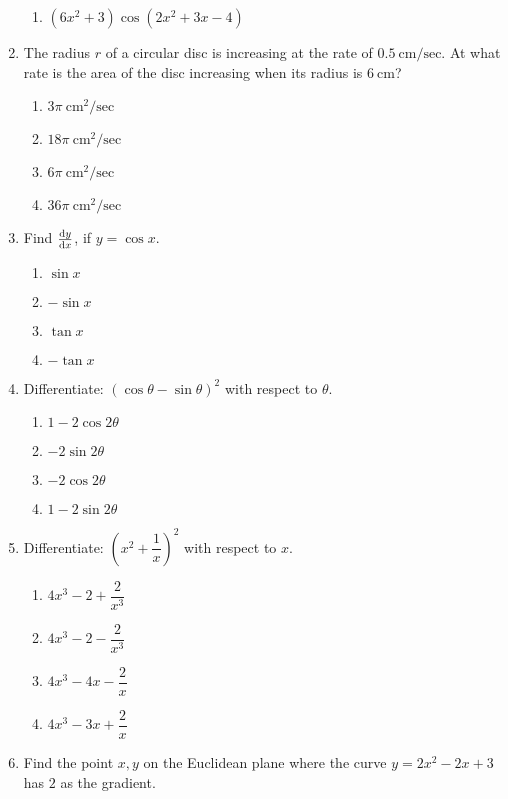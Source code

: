 \begin{multicols}{2}
\begin{enumerate}[label={\arabic*.}]
\begin{enumerate}[label={\Alph*.}]
		\item \((6{x}^{2} + 3) \cos(2{x}^{2}+3x-4)\)
	\end{enumerate}
\item The radius \(r\) of a circular disc is increasing at the rate of \(0.5\ \text{cm/sec}\). At what rate is the area of the disc increasing when its radius is \(6\ \text{cm}\)?
	\begin{enumerate}[label={\Alph*.}]
		\item \(3\pi\ \text{cm}^2/\text{sec}\)
		\item \(18\pi\ \text{cm}^2/\text{sec}\)
		\item \(6\pi\ \text{cm}^2/\text{sec}\)
		\item \(36\pi\ \text{cm}^2/\text{sec}\)
	\end{enumerate}
\item Find \(\dv{y}{x}\), if \(y = \cos x\).
	\begin{enumerate}[label={\Alph*.}]
		\item  \(\sin x\)
		\item  \(-\sin x\)
		\item  \(\tan x\)
		\item  \(-\tan x\)
	\end{enumerate}
\item Differentiate: \((\cos \theta - \sin \theta)^2\) with respect to \(\theta\).
	\begin{enumerate}[label={\Alph*.}]
		\item  \(1-2\cos 2\theta\)
		\item  \(-2\sin 2\theta\)
		\item  \(-2\cos 2\theta\)
		\item  \(1-2\sin 2\theta\)
	\end{enumerate}
\item Differentiate: \(\left({x}^{2} + \dfrac{1}{x}\right)^2\) with respect to \(x\).
	\begin{enumerate}[label={\Alph*.}]
		\item \(4{x}^{3} - 2 + \dfrac{2}{{x}^{3}}\)
		\item \(4{x}^{3} - 2 - \dfrac{2}{{x}^{3}}\)
		\item \(4{x}^{3} - 4x - \dfrac{2}{x}\)
		\item \(4{x}^{3} - 3x + \dfrac{2}{x}\)
	\end{enumerate}
\item Find the point \(x,y\) on the Euclidean plane where the curve \(y = 2x^{2} - 2x +3\) has \(2\) as the gradient.
\begin{enumerate}[label={\Alph*.}]

\end{enumerate}
\end{enumerate}
\end{multicols}
